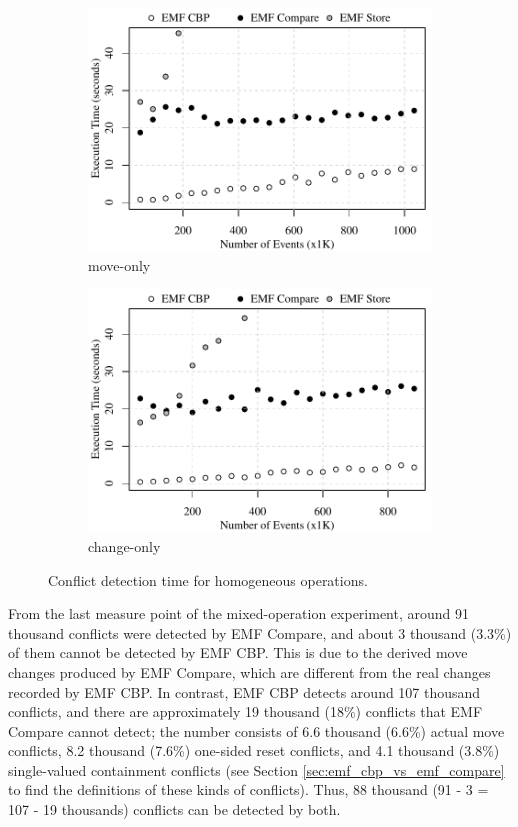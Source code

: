\begin{figure}[ht]
\begin{subfigure}[t]{0.490\linewidth}
	\includegraphics[width=\linewidth]{move-conflict-time-events}
	\caption{move-only}
	\label{fig:move-conflict-time-events}
\end{subfigure}
\hfill
\begin{subfigure}[t]{0.490\linewidth}
	\includegraphics[width=\linewidth]{change-conflict-time-events}
	\caption{change-only}
	\label{fig:change-conflict-time-events}
\end{subfigure}
\caption{Conflict detection time for homogeneous operations.}
\label{fig:homgeneous_operation_time_events}
\end{figure}

From the last measure point of the mixed-operation experiment, around 91 thousand conflicts were detected by EMF Compare, and about 3 thousand (3.3\%) of them cannot be detected by EMF CBP. This is due to the derived move changes produced by EMF Compare, which are different from the real changes recorded by EMF CBP. In contrast, EMF CBP detects around 107 thousand conflicts, and there are approximately 19 thousand (18\%) conflicts that EMF Compare cannot detect; the number consists of 6.6 thousand (6.6\%) actual move conflicts, 8.2  thousand (7.6\%) one-sided reset conflicts, and 4.1 thousand (3.8\%) single-valued containment conflicts (see Section \ref{sec:emf_cbp_vs_emf_compare} to find the definitions of these kinds of conflicts). Thus, 88 thousand (91 - 3 = 107 - 19 thousands) conflicts can be detected by both.

